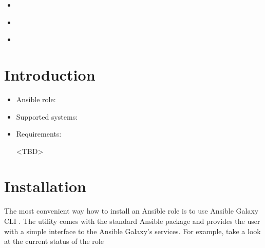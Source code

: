 \documentclass[letterpaper,10pt,english]{sphinxmanual}
\begin{document}
\begin{sphinxShadowBox}
\begin{itemize}
\begin{itemize}
\begin{itemize}
\end{itemize}

\item {} 
\label{\detokenize{guide:id12}}{\hyperref[\detokenize{guide:variables}]{}}

\item {} 
\label{\detokenize{guide:id13}}{\hyperref[\detokenize{guide:default-variables}]{}}

\item {} 
\label{\detokenize{guide:id14}}{\hyperref[\detokenize{guide:best-practice}]{}}

\end{itemize}

\end{itemize}
\end{sphinxShadowBox}


\section{Introduction}
\label{\detokenize{guide:introduction}}\label{\detokenize{guide:ug-introduction}}\begin{itemize}
\item {} 
Ansible role: 

\item {} 
Supported systems: 

\item {} 
Requirements: 

\textless{}TBD\textgreater{}

\end{itemize}


\section{Installation}
\label{\detokenize{guide:installation}}\label{\detokenize{guide:ug-installation}}
The most convenient way how to install an Ansible role is to use
Ansible Galaxy CLI . The utility comes with the
standard Ansible package and provides the user with a simple interface
to the Ansible Galaxy’s services. For example, take a look at the
current status of the role
\end{document}
